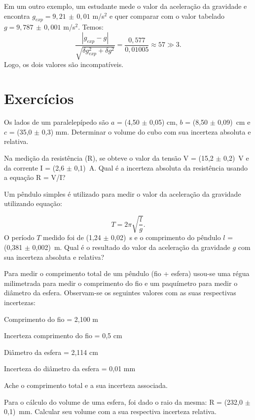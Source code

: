 Em um outro exemplo, um estudante mede o valor da aceleração da gravidade e encontra $g_{exp}=9,21\,\pm\,0,01$ m/s$^2$ e quer comparar com o valor tabelado $g=9,787\,\pm\,0,001$ m/s$^2$. Temos:
$$\frac{|g_{exp} -g |}{\sqrt{\delta g^2_{exp}+\delta g^2}}=\frac{0,577}{0,01005}\approx 57\gg 3.$$
Logo, os dois valores são incompat\'iveis.



\section*{Exercícios}

\begin{num}

\item Os lados de um paralelepípedo são $a$ = (4,50 $\pm$ 0,05) cm, $b$ = (8,50 $\pm$ 0,09)~cm e $c$ = (35,0 $\pm$ 0,3) mm. Determinar o volume do cubo com sua incerteza absoluta e relativa.

\item Na medição da resistência (R), se obteve o valor da tensão V = (15,2 $\pm$ 0,2)~V e da corrente I = (2,6 $\pm$ 0,1)~A. Qual é a incerteza absoluta da resistência usando a equação R = V/I?
 
\item Um pêndulo simples é utilizado para medir o valor da aceleração da gravidade utilizando equação:

\[ 
T = 2 \pi \sqrt{\frac{l}{g}}.
\]
\noindent
O período $T$ medido foi de (1,24 $\pm$ 0,02)~s e o comprimento do pêndulo $l$ = (0,381 $\pm$ 0,002)~m. Qual é o resultado do valor da aceleração da gravidade $g$ com sua incerteza absoluta e relativa?

\item Para medir o comprimento total de um pêndulo (fio + esfera) usou-se uma régua milimetrada para medir o comprimento do fio e um paquímetro para medir o diâmetro da esfera. Observam-se os seguintes valores com as suas respectivas incertezas: 
\begin{iten}
\item[ ]Comprimento do fio = 2,100 m			
\item[ ] Incerteza comprimento do fio = 0,5 cm
\item[ ]Diâmetro da esfera = 2,114 cm			
\item[ ] Incerteza do diâmetro da esfera = 0,01 mm
\end{iten}
\noindent 
Ache o comprimento total e a sua incerteza associada.

\item Para o cálculo do volume de uma esfera, foi dado o raio da mesma: R = (232,0 $\pm$ 0,1)~mm. Calcular seu volume com a sua respectiva incerteza relativa.


\end{num}
